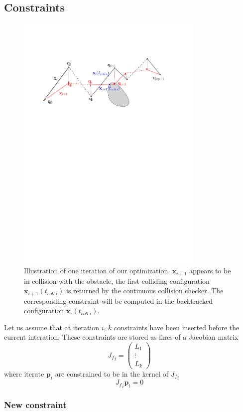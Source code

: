 \documentclass{tADR2e}
\newcommand\p{\mathbf{p}}
\newcommand\xx{\mathbf{x}} %
\newcommand\tcolli{t_{coll\ i}}
\newcommand\Jf{{J_f}}
\begin{document}
\subsection{Constraints}

\begin{figure}
	\centering
	\includegraphics[width=9cm]{optim_grad.pdf}
	\caption{Illustration of one iteration of our optimization. $\xx_{i+1}$ 
	appears 
	to be in collision with the obstacle, the first colliding configuration 
	$\xx_{i+1}(\tcolli)$ is returned by the continuous collision checker. The 
	corresponding constraint will be computed in the backtracked configuration 
	$\xx_{i}(\tcolli)$.}
	\label{optim_grad}
\end{figure}

Let us assume that at iteration $i$, $k$ constraints have been inserted before the current interation. These constraints are stored as lines of a Jacobian matrix
$$
\Jf_{i} = \left(\begin{array}{c}L_1 \\ \vdots \\ L_k\end{array}\right)
$$
where iterate $\p_i$ are constrained to be in the kernel of $\Jf_{i}$
$$
\Jf_{i} \p_i = 0
$$

\subsubsection{New constraint}
\end{document}
